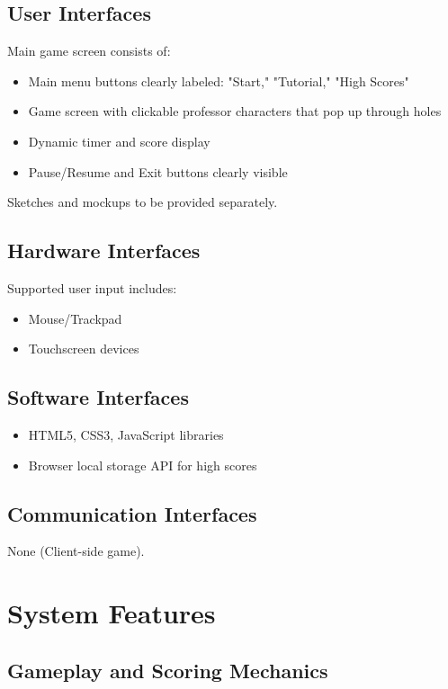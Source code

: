 \documentclass{scrreprt}
\begin{document}
\section{User Interfaces}
Main game screen consists of:
\begin{itemize}
    \item Main menu buttons clearly labeled: "Start," "Tutorial," "High Scores"
    \item Game screen with clickable professor characters that pop up through holes
    \item Dynamic timer and score display
    \item Pause/Resume and Exit buttons clearly visible
\end{itemize}

Sketches and mockups to be provided separately.

\section{Hardware Interfaces}
Supported user input includes:
\begin{itemize}
    \item Mouse/Trackpad
    \item Touchscreen devices
\end{itemize}

\section{Software Interfaces}
\begin{itemize}
    \item HTML5, CSS3, JavaScript libraries
    \item Browser local storage API for high scores
\end{itemize}

\section{Communication Interfaces}
None (Client-side game).

\chapter{System Features}

\section{Gameplay and Scoring Mechanics}
\end{document}
